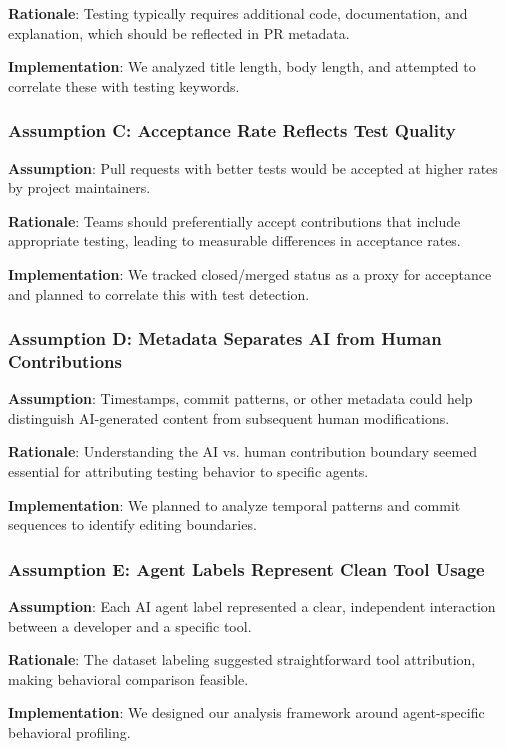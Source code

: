 \documentclass[conference]{IEEEtran}
\begin{document}
\textbf{Rationale}: Testing typically requires additional code, documentation, and explanation, which should be reflected in PR metadata.

\textbf{Implementation}: We analyzed title length, body length, and attempted to correlate these with testing keywords.

\subsubsection{Assumption C: Acceptance Rate Reflects Test Quality}

\textbf{Assumption}: Pull requests with better tests would be accepted at higher rates by project maintainers.

\textbf{Rationale}: Teams should preferentially accept contributions that include appropriate testing, leading to measurable differences in acceptance rates.

\textbf{Implementation}: We tracked closed/merged status as a proxy for acceptance and planned to correlate this with test detection.

\subsubsection{Assumption D: Metadata Separates AI from Human Contributions}

\textbf{Assumption}: Timestamps, commit patterns, or other metadata could help distinguish AI-generated content from subsequent human modifications.

\textbf{Rationale}: Understanding the AI vs. human contribution boundary seemed essential for attributing testing behavior to specific agents.

\textbf{Implementation}: We planned to analyze temporal patterns and commit sequences to identify editing boundaries.

\subsubsection{Assumption E: Agent Labels Represent Clean Tool Usage}

\textbf{Assumption}: Each AI agent label represented a clear, independent interaction between a developer and a specific tool.

\textbf{Rationale}: The dataset labeling suggested straightforward tool attribution, making behavioral comparison feasible.

\textbf{Implementation}: We designed our analysis framework around agent-specific behavioral profiling.
\end{document}
